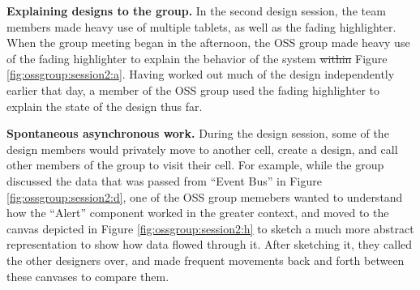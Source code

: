 \documentclass[12pt,fleqn]{ucithesis}
\providecommand{\DIFaddtex}[1]{{\protect\color{blue}\uwave{#1}}} %
\providecommand{\DIFdeltex}[1]{{\protect\color{red}\sout{#1}}}                      %
\providecommand{\DIFaddbegin}{} %
\providecommand{\DIFaddend}{} %
\providecommand{\DIFdelbegin}{} %
\providecommand{\DIFdelend}{} %
\providecommand{\DIFadd}[1]{\texorpdfstring{\DIFaddtex{#1}}{#1}} %
\providecommand{\DIFdel}[1]{\texorpdfstring{\DIFdeltex{#1}}{}} %
\begin{document}
\textbf{Explaining designs to the group.} In the second design session, the team members made heavy use of multiple tablets, as well as the fading highlighter. When the group meeting began in the afternoon, the OSS group made heavy use of the fading highlighter to explain the behavior of the system \DIFdelbegin \DIFdel{within }\DIFdelend \DIFaddbegin \DIFadd{shown in }\DIFaddend Figure \ref{fig:ossgroup:session2:a}. Having worked out much of the design independently earlier that day, a member of the OSS group used the fading highlighter to explain the state of the design thus far. 

\textbf{Spontaneous asynchronous work.} During the design session, some of the design members would privately move to another cell, create a design, and call other members of the group to visit their cell. For example, while the group discussed the data that was passed from ``Event Bus'' in Figure \ref{fig:ossgroup:session2:d}, one of the OSS group memebers wanted to understand how the ``Alert'' component worked in the greater context, and moved to the canvas depicted in Figure \ref{fig:ossgroup:session2:h} to sketch a much more abstract representation to show how data flowed through it. After sketching it, they called the other designers over, and made frequent movements back and forth between these canvases to compare them.
\end{document}
